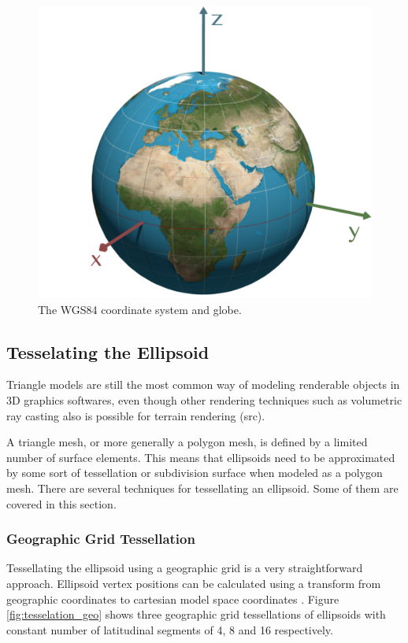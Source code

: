 \begin{figure}
\centering
\includegraphics[scale=0.25]{figures/wgs84.pdf}
\caption{The WGS84 coordinate system and globe.}
\label{fig:wgs84}
\end{figure}

\subsection{Tesselating the Ellipsoid}

Triangle models are still the most common way of modeling renderable objects in 3D graphics softwares, even though other rendering techniques such as volumetric ray casting also is possible for terrain rendering (src).

A triangle mesh, or more generally a polygon mesh, is defined by a limited number of surface elements. This means that ellipsoids need to be approximated by some sort of tessellation or subdivision surface when modeled as a polygon mesh. There are several techniques for tessellating an ellipsoid. Some of them are covered in this section.

\subsubsection{Geographic Grid Tessellation}
\label{sec:geogrid}
Tessellating the ellipsoid using a geographic grid is a very straightforward approach. Ellipsoid vertex positions can be calculated using a transform from geographic coordinates to cartesian model space coordinates \cite[p. 25]{cozzi11}. Figure \ref{fig:tesselation_geo} shows three geographic grid tessellations of ellipsoids with constant number of latitudinal segments of 4, 8 and 16 respectively.

